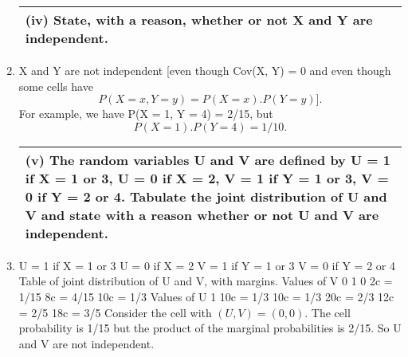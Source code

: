 \documentclass[a4paper,12pt]{article}
\begin{document}
\begin{enumerate}
\begin{table}[ht!]
\centering
     
\begin{tabular}{|p{15cm}|}
     
\hline        

\noindent

(iv) State, with a reason, whether or not X and Y are independent.
\\ \hline
      
\end{tabular}
    
\end{table}


\item  X and Y are not independent [even though Cov(X, Y) = 0 and even though some cells have 
\[P(X = x, Y = y) = P(X = x).P(Y = y)].\] 
For example, we have P(X = 1, Y = 4) = 2/15, but 
\[P(X = 1).P(Y = 4) = 1/10.\]


\begin{table}[ht!]
     
\centering
     
\begin{tabular}{|p{15cm}|}
     
\hline        

\noindent

(v) The random variables U and V are defined by
U = 1 if X = 1 or 3, U = 0 if X = 2,
V = 1 if Y = 1 or 3, V = 0 if Y = 2 or 4.
Tabulate the joint distribution of U and V and state with a reason whether or not U and V are independent.

\\ \hline
      
\end{tabular}
    
\end{table}


\item  U = 1 if X = 1 or 3 U = 0 if X = 2
V = 1 if Y = 1 or 3 V = 0 if Y = 2 or 4
Table of joint distribution of U and V, with margins.
Values of V
0
1
0
2c = 1/15
8c = 4/15
10c = 1/3
Values of U
1
10c = 1/3
10c = 1/3
20c = 2/3
12c = 2/5
18c = 3/5
Consider the cell with $(U, V) = (0, 0)$. The cell probability is 1/15 but the product of the marginal probabilities is 2/15. So U and V are not independent.
\end{enumerate}
\end{document}
